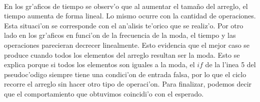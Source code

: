 \paragraph{}
En los gr'aficos de tiempo se observ'o que al aumentar el tama\~{n}o del arreglo, el tiempo 
aumenta de forma lineal. Lo mismo ocurre con la cantidad de operaciones. Esta situaci'on se 
corresponde con el an'alisis te'orico que se realiz'o. Por otro lado en los gr'aficos en funci'on 
de la frecuencia de la moda, el tiempo y las operaciones parecieran decrecer linealmente. Esto 
evidencia que el mejor caso se produce cuando todos los elementos del arreglo resultan ser la moda. Esto se
explica porque si todos los elementos son iguales a la moda, el $if$ de la l'inea 5 del pseudoc'odigo
siempre tiene una condici'on de entrada falsa, por lo que el ciclo recorre el arreglo sin 
hacer otro tipo de operaci'on. Para finalizar, podemos decir que el comportamiento que obtuvimos coincidi'o con el esperado.
